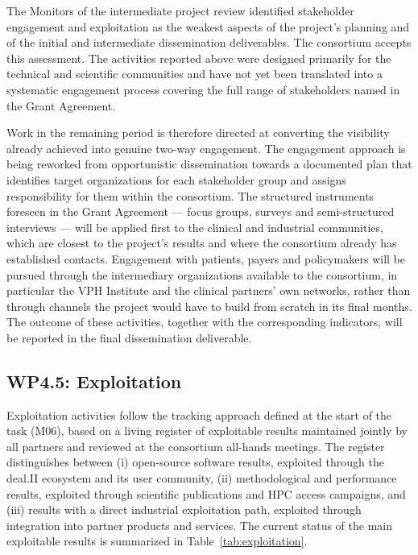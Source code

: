 \documentclass[a4paper,12pt, numbers]{article}
\begin{document}
The Monitors of the intermediate project review identified stakeholder engagement and
exploitation as the weakest aspects of the project's planning and of the initial and
intermediate dissemination deliverables. The consortium accepts this assessment. The
activities reported above were designed primarily for the technical and scientific
communities and have not yet been translated into a systematic engagement process
covering the full range of stakeholders named in the Grant Agreement.

Work in the remaining period is therefore directed at converting the visibility already
achieved into genuine two-way engagement. The engagement approach is being reworked from
opportunistic dissemination towards a documented plan that identifies target organizations
for each stakeholder group and assigns responsibility for them within the consortium. The
structured instruments foreseen in the Grant Agreement --- focus groups, surveys and
semi-structured interviews --- will be applied first to the clinical and industrial
communities, which are closest to the project's results and where the consortium already
has established contacts. Engagement with patients, payers and policymakers will be
pursued through the intermediary organizations available to the consortium, in particular
the VPH Institute and the clinical partners' own networks, rather than through channels
the project would have to build from scratch in its final months. The outcome of these
activities, together with the corresponding indicators, will be reported in the final
dissemination deliverable.


\subsection{WP4.5: Exploitation}\label{sec:wp4.5}

Exploitation activities follow the tracking approach defined at the start of the task (M06),
based on a living register of exploitable results maintained jointly by all partners and
reviewed at the consortium all-hands meetings. The register distinguishes between
(i) open-source software results, exploited through the deal.II ecosystem and its user
community, (ii) methodological and performance results, exploited through scientific
publications and HPC access campaigns, and (iii) results with a direct industrial
exploitation path, exploited through integration into partner products and services. The
current status of the main exploitable results is summarized in
Table~\ref{tab:exploitation}.
\end{document}
